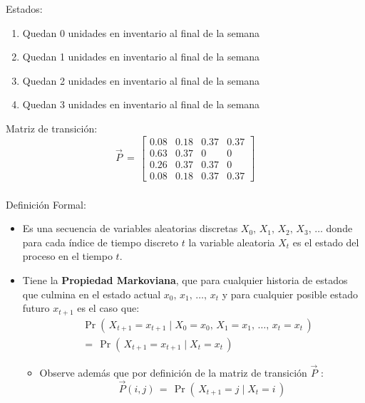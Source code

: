\documentclass[ 10pt, xcolor = dvipsnames]{beamer}
\begin{document}
\begin{frame}[allowframebreaks]
Estados: 
\begin{enumerate}
\item Quedan 0 unidades en inventario al final de la semana
\item Quedan 1 unidades en inventario al final de la semana
\item Quedan 2 unidades en inventario al final de la semana
\item Quedan 3 unidades en inventario al final de la semana
\end{enumerate}

Matriz de transici\'on:
\[
\vec{P} \, = \, 
\left[
\begin{array}{cccc}
0.08 & 0.18 & 0.37 & 0.37 \\
0.63 & 0.37 & 0    & 0    \\
0.26 & 0.37 & 0.37 & 0    \\
0.08 & 0.18 & 0.37 & 0.37
\end{array}
\right]
\]

\framebreak

\end{frame}

\begin{frame}[allowframebreaks]
\frametitle{\insertsection}

Definici\'on Formal: 
\begin{itemize}
\item Es una secuencia de variables aleatorias discretas $X_0, \, X_1, \, X_2, \, X_3, \, \dots$ \linebreak donde para cada \'indice de tiempo discreto $t$ la variable aleatoria $X_t$ \linebreak es el estado del proceso en el tiempo $t$. 
\item Tiene la \textbf{Propiedad Markoviana}, \ie que para cualquier historia de estados que culmina en el estado actual $x_0, \, x_1, \, \dots, \, x_t$ y para cualquier posible \linebreak estado futuro $x_{t+1}$ es el caso que: 
\begin{align*}
& \Pr( \, X_{t+1} = x_{t+1} \mid 
X_{0} = x_{0}, \, X_{1} = x_{1}, \, \dots, \, x_{t} = x_{t} \, ) \\[1ex]
& = \, \Pr( \, X_{t+1} = x_{t+1} \mid X_{t} = x_{t} \, )
\end{align*}
\fullcut
\halfcut
\begin{itemize}
\item Observe adem\'as que por definici\'on de la matriz de transici\'on $\vec{P}$ : 
\[
\vec{P}(i,j) \, = \,
\Pr( \, X_{t+1} = j \mid X_{t} = i \, )
\]
\end{itemize}

\end{itemize}

\end{frame}
\end{document}
